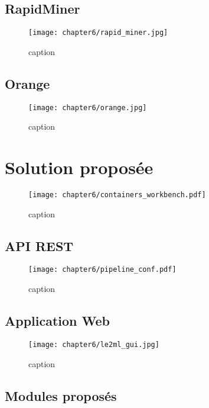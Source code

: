 \subsection{RapidMiner}

\begin{figure}[H]
	\centering
	\texttt{[image: chapter6/rapid\_miner.jpg]}
        \caption{caption}
	\label{fig:rapid_miner}
\end{figure}

\subsection{Orange}

\begin{figure}[H]
	\centering
	\texttt{[image: chapter6/orange.jpg]}
        \caption{caption}
	\label{fig:orange}
\end{figure}

\section{Solution proposée}

\begin{figure}[H]
	\centering
	\texttt{[image: chapter6/containers\_workbench.pdf]}
        \caption{caption}
	\label{fig:containers_workbench}
\end{figure}

\subsection{API REST}

\begin{figure}[H]
	\centering
	\texttt{[image: chapter6/pipeline\_conf.pdf]}
        \caption{caption}
	\label{fig:pipeline_conf}
\end{figure}

\subsection{Application Web}

\begin{figure}[H]
	\centering
	\texttt{[image: chapter6/le2ml\_gui.jpg]}
        \caption{caption}
	\label{fig:le2ml_gui}
\end{figure}

\subsection{Modules proposés}

